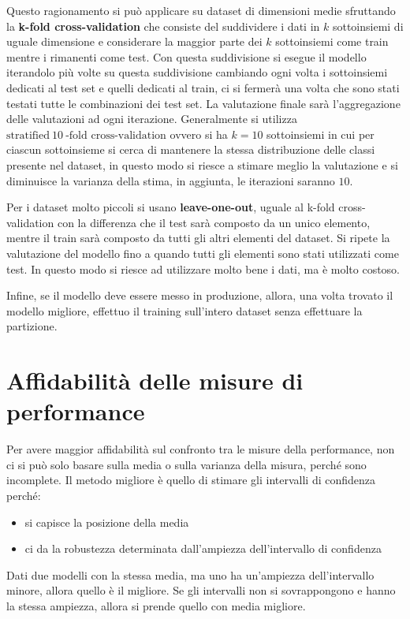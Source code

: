 Questo ragionamento si può applicare su dataset di dimensioni medie sfruttando la
\textbf{k-fold cross-validation} che consiste del suddividere i dati in $k$
sottoinsiemi di uguale dimensione e considerare la maggior parte dei $k$ sottoinsiemi
come train mentre i rimanenti come test. Con questa suddivisione si esegue il modello
iterandolo più volte su questa suddivisione cambiando ogni volta i sottoinsiemi
dedicati al test set e quelli dedicati al train, ci si fermerà una volta
che sono stati testati tutte le combinazioni dei test set. La valutazione finale
sarà l'aggregazione delle valutazioni ad ogni iterazione. Generalmente si utilizza
$\text{stratified} \ 10 \ \text{-fold cross-validation}$ ovvero si ha $k=10$ sottoinsiemi
in cui per ciascun sottoinsieme si cerca di mantenere la stessa distribuzione delle
classi presente nel dataset, in questo modo si riesce a stimare meglio la valutazione
e si diminuisce la varianza della stima, in aggiunta, le iterazioni saranno $10$.

Per i dataset molto piccoli si usano \textbf{leave-one-out}, uguale al k-fold
cross-validation con la differenza che il test sarà composto da un unico elemento,
mentre il train sarà composto da tutti gli altri elementi del dataset. Si ripete
la valutazione del modello fino a quando tutti gli elementi sono stati utilizzati
come test. In questo modo si riesce ad utilizzare molto bene i dati, ma è molto
costoso.

Infine, se il modello deve essere messo in produzione, allora, una volta trovato
il modello migliore, effettuo il training sull'intero dataset senza effettuare la
partizione.
\section{Affidabilità delle misure di performance}
Per avere maggior affidabilità sul confronto tra le misure della performance, non ci
si può solo basare sulla media o sulla varianza della misura, perché sono incomplete.
Il metodo migliore è quello di stimare gli intervalli di confidenza perché:
\begin{itemize}
    \item si capisce la posizione della media
    \item ci da la robustezza determinata dall'ampiezza dell'intervallo di confidenza
\end{itemize}
Dati due modelli con la stessa media, ma uno ha un'ampiezza dell'intervallo minore,
allora quello è il migliore. Se gli intervalli non si sovrappongono e hanno la
stessa ampiezza, allora si prende quello con media migliore.


